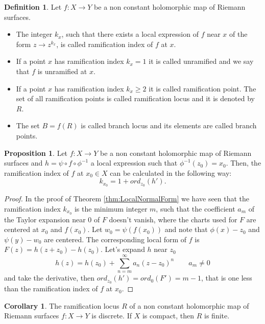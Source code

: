 \documentclass[12pt,a4paper,openright,twoside]{report}
\theoremstyle{definition} %
\newtheorem{proposition}[theorem]{Proposition}
\newtheorem{corollary}[theorem]{Corollary}
\newtheorem{definition}[theorem]{Definition}
\begin{document}
\begin{definition}
    Let \(f : X \to Y\) be a non constant holomorphic map of Riemann surfaces.
    \begin{itemize}
        \item The integer \(k_x\), such that there exists a local expression of \(f\) near \(x\) of the form \(z \to z^{k_x}\), is called ramification index of \(f\) at \(x\).
        \item If a point \(x\) has ramification index \(k_x = 1\) it is called unramified and we say that \(f\) is unramified at \(x\).
        \item If a point \(x\) has ramification index \(k_x \geq 2\) it is called ramification point. The set of all ramification points is called ramification locus and it is denoted by \(R\).
        \item The set \(B = f(R)\) is called branch locus and its elements are called branch points.
    \end{itemize}
\end{definition}

\begin{proposition}\label{prop:CalcoloRamificazione}
    Let \(f : X \to Y\) be a non constant holomorphic map of Riemann surfaces and \(h = \psi \circ f \circ \phi^{-1} \) a local expression such that \(\phi^{-1}(z_0) = x_0\). Then, the ramification index of \(f\) at \(x_0 \in X\) can be calculated in the following way:
    \[
    k_{x_0} = 1 + ord_{z_0}(h').
    \]
\end{proposition}

\begin{proof}
    In the proof of Theorem \ref{thm:LocalNormalForm} we have seen that the ramification index \(k_{x_0}\) is the minimum integer \(m\), such that the coefficient \(a_m\) of the Taylor expansion near \(0\) of \(F\) doesn't vanish, where the charts used for \(F\) are centered at \(x_0\) and \(f(x_0)\). Let \(w_0 = \psi(f(x_0))\) and note that \(\phi(x) - z_0\) and \(\psi(y)-w_0\) are centered. The corresponding local form of \(f\) is \(F(z) = h(z+z_0) - h(z_0)\).
    Let's expand \(h\) near \(z_0\)
    \[
    h(z) = h(z_0) + \sum_{n = m}^{\infty} a_n (z-z_0)^n \qquad a_{m} \neq 0
    \]
    and take the derivative, then \(ord_{z_0}(h') = ord_{0}(F') = m - 1\), that is one less than the ramification index of \(f\) at \(x_0\).
\end{proof}

\begin{corollary}
    The ramification locus \(R\) of a non constant holomorphic map of Riemann surfaces \(f : X \to Y\) is discrete.
    If \(X\) is compact, then \(R\) is finite.
\end{corollary}
\end{document}
